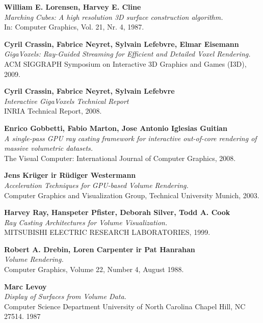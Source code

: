 \cleardoublepage
{}
\begin{thebibliography}{MMM99}

  {\bf William E. Lorensen, Harvey E. Cline}\\
  {\em Marching Cubes: A high resolution 3D surface construction algorithm.}\\
  In: Computer Graphics, Vol. 21, Nr. 4, 1987.

  {\bf Cyril Crassin, Fabrice Neyret, Sylvain Lefebvre, Elmar Eisemann}\\
  {\em GigaVoxels: Ray-Guided Streaming for Efficient and Detailed Voxel
  Rendering.}\\
  ACM SIGGRAPH Symposium on Interactive 3D Graphics and Games (I3D), 2009.

  {\bf Cyril Crassin, Fabrice Neyret, Sylvain Lefebvre}\\
  {\em Interactive GigaVoxels Technical Report}\\
  INRIA Technical Report, 2008.

  {\bf Enrico Gobbetti, Fabio Marton, Jose Antonio Iglesias Guitian}\\
  {\em A single-pass GPU ray casting framework for interactive out-of-core
  rendering of massive volumetric datasets.}\\
  The Visual Computer: International Journal of Computer Graphics, 2008.

  {\bf Jens Krüger ir Rüdiger Westermann}\\
  {\em Acceleration Techniques for GPU-based Volume Rendering.}\\
  Computer Graphics and Visualization Group, Technical University Munich, 2003.

  {\bf Harvey Ray, Hanspeter Pﬁster, Deborah Silver, Todd A. Cook}\\
  {\em Ray Casting Architectures for Volume Visualization.}\\
  MITSUBISHI ELECTRIC RESEARCH LABORATORIES, 1999.

  {\bf Robert A. Drebin, Loren Carpenter ir Pat Hanrahan}\\
  {\em Volume Rendering.}\\
  Computer Graphics, Volume 22, Number 4, August 1988.

  {\bf Marc Levoy}\\
  {\em Display of Surfaces from Volume Data.}\\
  Computer Science Department University of North Carolina Chapel Hill, NC 27514. 1987

\end{thebibliography}
